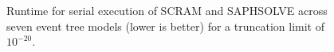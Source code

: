 \begin{figure}[]
  \centering
  
  \caption{Runtime for serial execution of SCRAM and SAPHSOLVE across seven event tree models (lower is better) for a truncation limit of $10^{-20}$.}
  \label{fig:execution_runtime_1e-20}
\end{figure}